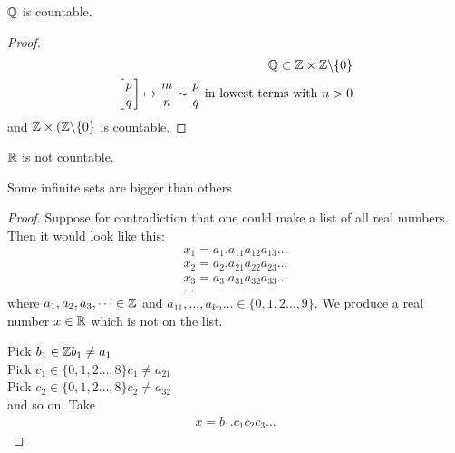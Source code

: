 \begin{pp}
	$\mathbb Q$ is countable.
	\begin{proof}
		\begin{align*}
		\mathbb Q \subset \mathbb Z \times \mathbb Z \backslash \{0 \} \\
		\left[ \frac p q \right] \mapsto \frac m n \sim \frac p q~ \text{in lowest terms with } n>0
		\end{align*}
		and $\mathbb Z \times (\mathbb Z \backslash \{0 \}$ is countable.
	\end{proof}
\end{pp}

\begin{tm}
	$\mathbb R$ is not countable.
\end{tm}

Some infinite sets are bigger than others

\begin{proof}
	Suppose for contradiction that one could make a list of all real numbers. Then it would look like this:
	\begin{align*}
	x_1 = a_1 . a_{11} a_{12} a_{13} \dots \\
	x_2 = a_2 . a_{21} a_{22} a_{23} \dots \\
	x_3 = a_3 . a_{31} a_{32} a_{33} \dots \\
	\dots
	\end{align*}
	where $a_1, a_2, a_3, \dots \in \mathbb Z$ and $a_11, \dots, a_{kn} \dots \in \{ 0,1,2 \dots, 9 \}$. We produce a real number $x \in \mathbb R$ which is not on the list. 
	
	Pick $b_1 \in \mathbb Z b_1 \neq a_1$ \\
	Pick $c_1 \in \{ 0,1,2 \dots, 8 \} c_1 \neq a_{21}$ \\
	Pick $c_2 \in \{ 0,1,2 \dots, 8 \} c_2 \neq a_{32}$ \\
	and so on.
	Take 
	\begin{align*}
	x = b_1 . c_1 c_2 c_3 \dots
	\end{align*}
\end{proof}







